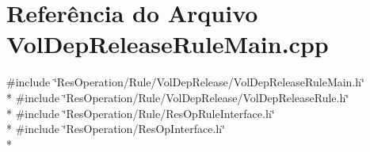 \section{Referência do Arquivo Vol\+Dep\+Release\+Rule\+Main.\+cpp}
\label{_rule_2_vol_dep_release_2_vol_dep_release_rule_main_8cpp}
{\ttfamily \#include \char`\"{}Res\+Operation/\+Rule/\+Vol\+Dep\+Release/\+Vol\+Dep\+Release\+Rule\+Main.\+h\char`\"{}}\\*
{\ttfamily \#include \char`\"{}Res\+Operation/\+Rule/\+Vol\+Dep\+Release/\+Vol\+Dep\+Release\+Rule.\+h\char`\"{}}\\*
{\ttfamily \#include \char`\"{}Res\+Operation/\+Rule/\+Res\+Op\+Rule\+Interface.\+h\char`\"{}}\\*
{\ttfamily \#include \char`\"{}Res\+Operation/\+Res\+Op\+Interface.\+h\char`\"{}}\\*
